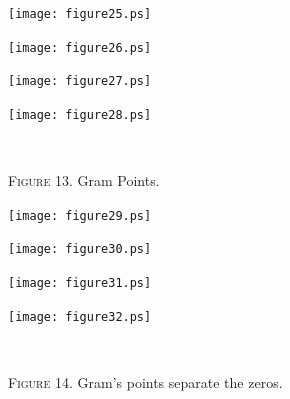 \documentclass[a4paper]{amsart}
\numberwithin{equation}{section}
\begin{document}
\begin{minipage}{320pt}
\begin{minipage}{56.8pt} 
\texttt{[image: figure25.ps]}
\end{minipage}\hfil
\begin{minipage}{56.8pt}
\texttt{[image: figure26.ps]}
\end{minipage}\hfil
\begin{minipage}{60.8pt}
\texttt{[image: figure27.ps]}
\end{minipage}\hfil
\begin{minipage}{60.8pt}
\texttt{[image: figure28.ps]}
\end{minipage}
\centerline{\ }
\centerline{{\scshape Figure} 13. Gram Points.}
\end{minipage}
\begin{large}
    
    


\end{large}
\begin{minipage}{320pt}
\begin{minipage}{56.8pt} 
\texttt{[image: figure29.ps]}
\end{minipage}\hfil
\begin{minipage}{56.8pt}
\texttt{[image: figure30.ps]}
\end{minipage}\hfil
\begin{minipage}{60.8pt}
\texttt{[image: figure31.ps]}
\end{minipage}\hfil
\begin{minipage}{60.8pt}
\texttt{[image: figure32.ps]}
\end{minipage}
\centerline{\ }
\centerline{{\scshape Figure} 14. Gram's points separate the zeros.}
\end{minipage}
\end{document}

